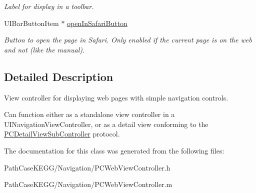 \begin{Indent}
\begin{DoxyCompactItemize}
\begin{DoxyCompactList}\small\item\em Label for display in a toolbar. \end{DoxyCompactList}\item 
\hypertarget{interface_p_c_web_view_controller_a0dd41a844fd61128a04a0ec44defb7f6}{
UIBarButtonItem $\ast$ \hyperlink{interface_p_c_web_view_controller_a0dd41a844fd61128a04a0ec44defb7f6}{openInSafariButton}}
\label{interface_p_c_web_view_controller_a0dd41a844fd61128a04a0ec44defb7f6}

\begin{DoxyCompactList}\small\item\em Button to open the page in Safari. Only enabled if the current page is on the web and not (like the manual). \end{DoxyCompactList}\end{DoxyCompactItemize}
\end{Indent}


\subsection{Detailed Description}
View controller for displaying web pages with simple navigation controls. 

Can function either as a standalone view controller in a UINavigationViewController, or as a detail view conforming to the \hyperlink{protocol_p_c_detail_view_sub_controller-p}{PCDetailViewSubController} protocol. 

The documentation for this class was generated from the following files:\begin{DoxyCompactItemize}
\item 
PathCaseKEGG/Navigation/PCWebViewController.h\item 
PathCaseKEGG/Navigation/PCWebViewController.m\end{DoxyCompactItemize}

